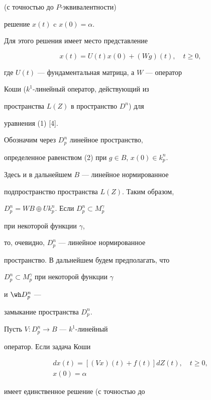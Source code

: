 (с точностью до $P$-эквивалентности)


решение $x(t)$ c $x(0) = \alpha$.


Для этого решения имеет место представление


\begin{equation}


x(t) = U(t)x(0) + (Wg)(t),\quad t \ge 0,


\end{equation}


где $U(t)$ --- фундаментальная матрица, а $W$ --- оператор


Коши ($k^1$-линейный оператор, действующий из


пространства $L(Z)$ в пространство $D^n$) для


уравнения (1) [4].





Обозначим через $D^n_p$ линейное пространство,


определенное равенством (2) при $g \in B$, $x(0) \in k_p^n$.


Здесь и в дальнейшем $B$ --- линейное нормированное


подпространство пространства $L(Z)$. Таким образом,


$D^n_p = WB\oplus Uk^n_p$. Если $D_p^n \subset M_p^\gamma$


при некоторой функции $\gamma$,


то, очевидно, $D_p^n$ --- линейное нормированное


пространство. В дальнейшем будем предполагать, что


$D_p^n \subset M_p^\gamma $ при некоторой функции $\gamma$


и $\wh D_p^n$ ---


замыкание пространства $D_p^n$.





Пусть $V:D_p^n \to B$ --- $k^1$-линейный


оператор. Если задача Коши


\begin{gather}


dx(t) = [(Vx)(t) + f(t)]dZ(t),\quad t \ge 0,\\


%


x(0) = \alpha


\end{gather}


имеет единственное решение (с точностью до


